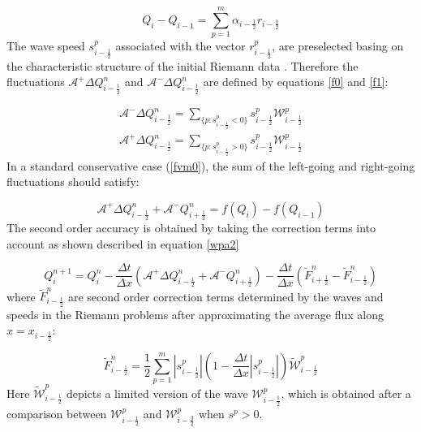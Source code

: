\documentclass[12pt,a4paper]{article}
\newcommand{\donna}[1]{{\color{red}{#1}}}
\begin{document}
	\begin{equation}
		Q_{i} -  Q_{i-1} = \sum_{p=1}^{m}  \alpha_{i-\frac{1}{2}} r_{i-\frac{1}{2}}
		\label{wpa19}
	\end{equation}
	The wave speed $s_{i-\frac{1}{2}}^{p}$ associated with the vector $r_{i-\frac{1}{2}}^{p}$, are preselected basing on the characteristic structure of the initial Riemann data \cite{ge:2008}. Therefore the fluctuations $\mathcal{A^{+}}\Delta Q_{i-\frac{1}{2}}^{n}$  and $\mathcal{A^{-}}\Delta Q_{i-\frac{1}{2}}^{n} $ are defined by equations \eqref{f0} and \eqref{f1}:
	
	\begin{eqnarray}
		\mathcal{A^{-}}\Delta Q_{i-\frac{1}{2}}^{n} = \sum_{\{ p:s_{i-\frac{1}{2}}^{p}<0\}} s_{i-\frac{1}{2}}^{p} \mathcal{W}_{i-\frac{1}{2}}^{p}
		\label{f0}\\
		\mathcal{A^{+}}\Delta Q_{i-\frac{1}{2}}^{n} =\sum_{\{ p:s_{i-\frac{1}{2}}^{p}>0\}} s_{i-\frac{1}{2}}^{p} \mathcal{W}_{i-\frac{1}{2}}^{p}
		\label{f1}
	\end{eqnarray}
	In a standard  conservative case (\eqref{fvm0}), the sum of the left-going and right-going fluctuations should satisfy:
	
	\begin{equation}
		\mathcal{A^{+}}\Delta 	Q_{i-\frac{1}{2}}^{n} + \mathcal{A^{-}}Q_{i+\frac{1}{2}}^{n} = f(Q_{i}) - f(Q_{i-1})
	\end{equation}
	The second order accuracy is obtained by taking the correction terms into account as shown described in equation \eqref{wpa2}
	
	\begin{equation}
		Q_{i}^{n+1} =  Q_{i}^{n} - \frac{\Delta t}{\Delta x}(\mathcal{A^{+}}\Delta 	Q_{i-\frac{1}{2}}^{n} + \mathcal{A^{-}}Q_{i+\frac{1}{2}}^{n}) -  \frac{\Delta t}{\Delta x} (\tilde{F}_{i+\frac{1}{2}}^{n} - \tilde{F}_{i-\frac{1}{2}}^{n} )
		\label{wpa2}
	\end{equation}
	where $\tilde{F}_{i-\frac{1}{2}}^{n} $ are second order correction terms determined by the waves and speeds in the Riemann problems after approximating the average flux along  $x = x_{i - \frac{1}{2}}$:
	
	\begin{equation}
		\tilde{F}_{i-\frac{1}{2}}^{n} = \frac{1}{2} \sum_{p=1}^{m}  |s_{i- \frac{1}{2}}^{p}| \left( 1 - \frac{\Delta t}{\Delta x} |s_{i- \frac{1}{2}}^{p}|\right) \tilde{\mathcal{W}}_{i-\frac{1}{2}}^{p} 
		\label{wpa13}
	\end{equation}
	Here $\tilde{\mathcal{W}}_{i-\frac{1}{2}}^{p} $ depicts a limited version of the wave $\mathcal{W}_{i-\frac{1}{2}}^{p} $, which is obtained after a comparison between $\mathcal{W}_{i-\frac{1}{2}}^{p} $ and $\mathcal{W}_{i-\frac{3}{2}}^{p} $ when $s^{p} >0$\cite{ba-le-mi-ro:2003}.\\
	
\end{document}
